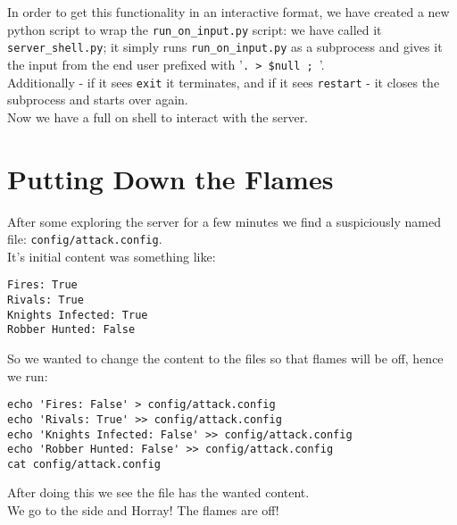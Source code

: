 \documentclass{article}
\begin{document}
In order to get this functionality in an interactive format,
we have created a new python script to wrap the \texttt{run\_on\_input.py} script:
we have called it \texttt{server\_shell.py}; it simply
runs \texttt{run\_on\_input.py} as a subprocess 
and gives it the input from the end user prefixed with '\texttt{. > \$null ; }'.\\
Additionally - if it sees \texttt{exit} it terminates, and
if it sees \texttt{restart} - it closes the subprocess and starts over again.\\

Now we have a full on shell to interact with the server.

\section{Putting Down the Flames}
After some exploring the server for a few minutes we find a suspiciously named
file: \texttt{config/attack.config}.\\
It's initial content was something like:
\begin{lstlisting}    
Fires: True
Rivals: True
Knights Infected: True
Robber Hunted: False
\end{lstlisting}

So we wanted to change the content to the files so that flames will be off,
hence we run:
\begin{lstlisting}
echo 'Fires: False' > config/attack.config
echo 'Rivals: True' >> config/attack.config
echo 'Knights Infected: False' >> config/attack.config
echo 'Robber Hunted: False' >> config/attack.config
cat config/attack.config
\end{lstlisting}
After doing this we see the file has the wanted content.\\

We go to the side and Horray! The flames are off!\\
\end{document}
